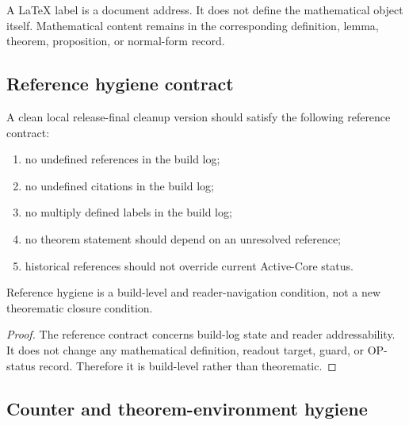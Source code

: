 \begin{remark}
\label{rem:v4011-labels-are-addresses}
A \LaTeX{} label is a document address. It does not define the mathematical
object itself. Mathematical content remains in the corresponding definition,
lemma, theorem, proposition, or normal-form record.
\end{remark}

\subsection{Reference hygiene contract}
\label{subsec:v4011-reference-hygiene-contract}

\begin{definition}
\label{def:v4011-reference-hygiene-contract}
A clean local release-final cleanup version should satisfy the following reference contract:
\begin{enumerate}[leftmargin=*]
 \item no undefined references in the build log;
 \item no undefined citations in the build log;
 \item no multiply defined labels in the build log;
 \item no theorem statement should depend on an unresolved reference;
 \item historical references should not override current Active-Core status.
\end{enumerate}
\end{definition}

\begin{lemma}
\label{lem:v4011-reference-hygiene-build-level}
Reference hygiene is a build-level and reader-navigation condition, not a new
theorematic closure condition.
\end{lemma}

\begin{proof}
The reference contract concerns build-log state and reader addressability. It
does not change any mathematical definition, readout target, guard, or OP-status
record. Therefore it is build-level rather than theorematic.
\end{proof}

\subsection{Counter and theorem-environment hygiene}
\label{subsec:v4011-counter-theorem-environment-hygiene}

